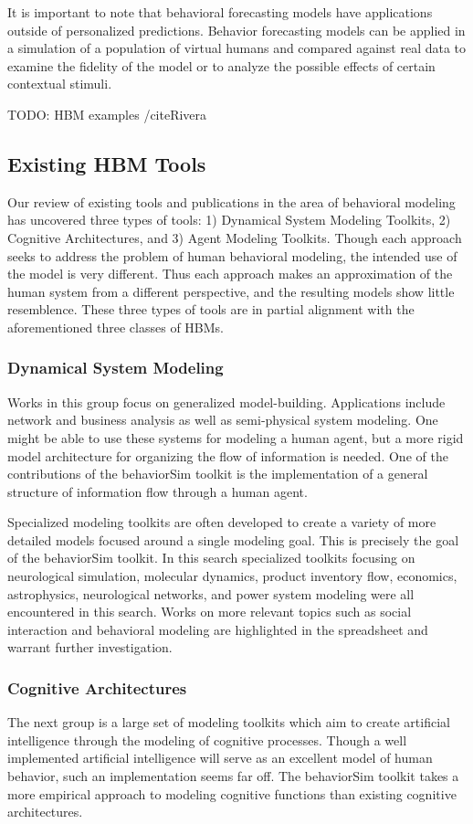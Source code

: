 It is important to note that behavioral forecasting models have applications outside of personalized predictions. 
Behavior forecasting models can be applied in a simulation of a population of virtual humans and compared against real data to examine the fidelity of the model or to analyze the possible effects of certain contextual stimuli. 

TODO: HBM examples /cite{Rivera}


\subsection{Existing HBM Tools}
Our review of existing tools and publications in the area of behavioral modeling has uncovered three types of tools: 1) Dynamical System Modeling Toolkits, 2) Cognitive Architectures, and 3) Agent Modeling Toolkits. 
Though each approach seeks to address the problem of human behavioral modeling, the intended use of the model is very different. 
Thus each approach makes an approximation of the human system from a different perspective, and the resulting models show little resemblence.
These three types of tools are in partial alignment with the aforementioned three classes of HBMs.

\subsubsection{Dynamical System Modeling}
Works in this group focus on generalized model-building. 
Applications include network and business analysis as well as semi-physical system modeling. 
One might be able to use these systems for modeling a human agent, but a more rigid model architecture for organizing the flow of information is needed. 
One of the contributions of the behaviorSim toolkit is the implementation of a general structure of information flow through a human agent.

Specialized modeling toolkits are often developed to create a variety of more detailed models focused around a single modeling goal. 
This is precisely the goal of the behaviorSim toolkit. 
In this search specialized toolkits focusing on neurological simulation, molecular dynamics, product inventory flow, economics, astrophysics, neurological networks, and power system modeling were all encountered in this search. 
Works on more relevant topics such as social interaction and behavioral modeling are highlighted in the spreadsheet and warrant further investigation.

\subsubsection{Cognitive Architectures}
The next group is a large set of modeling toolkits which aim to create artificial intelligence through the modeling of cognitive processes. 
Though a well implemented artificial intelligence will serve as an excellent model of human behavior, such an implementation seems far off. 
The behaviorSim toolkit takes a more empirical approach to modeling cognitive functions than existing cognitive architectures.

